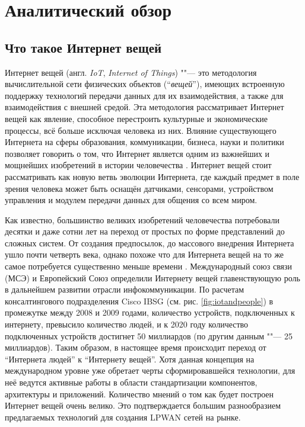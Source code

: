 \chapter{Аналитический обзор}
\label{cha:analysis}
%
%


\section{Что такое Интернет вещей}

Интернет вещей (англ. \textit{IoT}, \textit{Internet of Things}) ""--- это методология вычислительной сети физических объектов (``\textit{вещей}''), имеющих встроенную поддержку технологий передачи данных для их взаимодействия, а также для взаимодействия с внешней средой.
Эта методология рассматривает Интернет вещей как явление, способное перестроить культурные и экономические процессы, всё больше исключая человека из них.
Влияние существующего Интернета на сферы образования, коммуникации, бизнеса, науки и политики позволяет говорить о том, что Интернет является одним из важнейших и мощнейших изобретений в истории человечества \cite{evans2011internet}.
Интернет вещей стоит рассматривать как новую ветвь эволюции Интернета, где каждый предмет в поле зрения человека может быть оснащён датчиками, сенсорами, устройством управления и модулем передачи данных для общения со всем миром.

Как известно, большинство великих изобретений человечества потребовали десятки и даже сотни лет на переход от простых по форме представлений до сложных систем.
От создания предпосылок, до массового внедрения Интернета ушло почти четверть века, однако похоже что для Интернета вещей на то же самое потребуется существенно меньше времени \cite{chernyak2013}.
Международный союз связи (МСЭ) и Европейский Союз определили Интернету вещей главенствующую роль в дальнейшем развитии отрасли инфокоммуникации. 
По расчетам консалтингового подразделения Cisco IBSG (см. рис. \ref{fig:iotandpeople}) в промежутке между 2008 и 2009 годами, количество устройств, подключенных к интернету, превысило количество людей, и к 2020 году количество подключенных устройств достигнет 50 миллиардов \cite{evans2011internet} (по другим данным \cite{denise2014} ""--- 25 миллиардов).
Таким образом, в настоящее время происходит переход от ``Интернета людей'' к ``Интернету вещей''.
Хотя данная концепция на международном уровне уже обретает черты сформировавшейся технологии, для неё ведутся активные работы в области стандартизации компонентов, архитектуры и приложений.
Количество мнений о том как будет построен Интернет вещей очень велико. 
Это подтверждается большим разнообразием предлагаемых технологий для создания LPWAN сетей на рынке.

